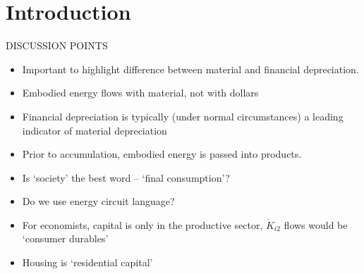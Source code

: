 %
%
%
\chapter{Introduction}
\label{chap:intro}




DISCUSSION POINTS
\begin{itemize}
\item Important to highlight difference between material and financial depreciation. 
\item Embodied energy flows with material, not with dollars
\item Financial depreciation is typically (under normal circumstances) a leading indicator of material depreciation
\item Prior to accumulation, embodied energy is passed into products.
\item Is `society' the best word – `final consumption'?
\item Do we use energy circuit language?
\item For economists, capital is only in the productive sector, $\dot{K}_{i2}$ flows would be `consumer durables'
\item Housing is `residential capital'
\end{itemize}

